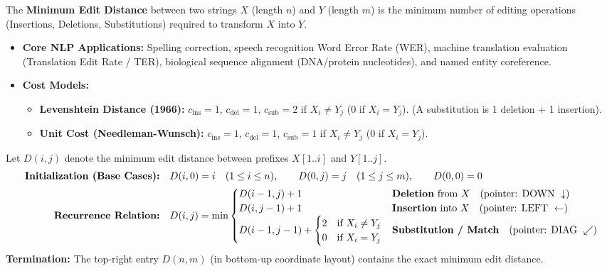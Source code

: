 \documentclass[10pt,a4paper]{article}
\begin{document}
\par\vspace{1pt}
The \textbf{Minimum Edit Distance} between two strings $X$ (length $n$) and $Y$ (length $m$) is the minimum number of editing operations (Insertions, Deletions, Substitutions) required to transform $X$ into $Y$.

\begin{itemize}[leftmargin=12pt, itemsep=0.5pt, parsep=0pt, topsep=0.5pt]
    \item \textbf{Core NLP Applications:} Spelling correction, speech recognition Word Error Rate (WER), machine translation evaluation (Translation Edit Rate / TER), biological sequence alignment (DNA/protein nucleotides), and named entity coreference.
    \item \textbf{Cost Models:}
    \begin{itemize}[leftmargin=10pt, itemsep=0.5pt]
        \item \textbf{Levenshtein Distance (1966):} $c_{\text{ins}} = 1$, $c_{\text{del}} = 1$, $c_{\text{sub}} = 2$ if $X_i \ne Y_j$ (0 if $X_i = Y_j$). (A substitution is 1 deletion + 1 insertion).
        \item \textbf{Unit Cost (Needleman-Wunsch):} $c_{\text{ins}} = 1$, $c_{\text{del}} = 1$, $c_{\text{sub}} = 1$ if $X_i \ne Y_j$ (0 if $X_i = Y_j$).
    \end{itemize}
\end{itemize}

\vspace{-2pt}
\begin{theoremprompt}[title={\bfseries\sffamily Dynamic Programming Recurrence for Minimum Edit Distance}]
\footnotesize
Let $D(i, j)$ denote the minimum edit distance between prefixes $X[1..i]$ and $Y[1..j]$.
\begin{align*}
\textbf{Initialization (Base Cases):} \quad & D(i, 0) = i \quad (1 \le i \le n), \qquad D(0, j) = j \quad (1 \le j \le m), \qquad D(0, 0) = 0 \\
\textbf{Recurrence Relation:} \quad & D(i, j) = \min \begin{cases}
D(i-1, j) + 1 & \text{\textbf{Deletion} from } X \quad (\text{pointer: DOWN } \downarrow) \\
D(i, j-1) + 1 & \text{\textbf{Insertion} into } X \quad (\text{pointer: LEFT } \leftarrow) \\
D(i-1, j-1) + \begin{cases} 2 & \text{if } X_i \ne Y_j \\ 0 & \text{if } X_i = Y_j \end{cases} & \text{\textbf{Substitution / Match}} \quad (\text{pointer: DIAG } \swarrow)
\end{cases}
\end{align*}
\textbf{Termination:} The top-right entry $D(n, m)$ (in bottom-up coordinate layout) contains the exact minimum edit distance.
\end{theoremprompt}
\end{document}
